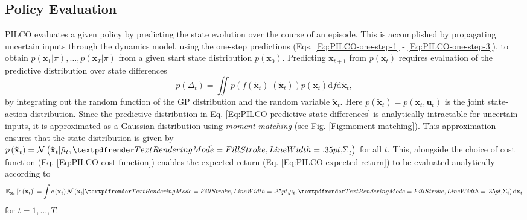 \subsection{Policy Evaluation}
\label{PILCO:policy-evaluation}
PILCO evaluates a given policy by predicting the state evolution over the course of an episode. This is accomplished by propagating uncertain inputs through the dynamics model, using the one-step predictions (Eqs. \ref{Eq:PILCO-one-step-1} - \ref{Eq:PILCO-one-step-3}), to obtain $p\left(\mathbf{x}_{1} | \pi\right), \ldots, p\left(\mathbf{x}_{T} | \pi\right)$ from a given start state distribution $p\left(\mathbf{x}_{0}\right)$. Predicting $\mathbf{x}_{t+1}$ from $p(\mathbf{x}_{t})$ requires evaluation of the predictive distribution over state differences
\begin{equation}
    p\left(\Delta_{t}\right)=\iint p\left(f\left(\tilde{\mathbf{x}}_{t}\right) | \left(\tilde{\mathbf{x}}_{t}\right)\right) p\left(\tilde{\mathbf{x}}_{t}\right) \mathrm{d} f \mathrm{d} \tilde{\mathbf{x}}_{t},
    \label{Eq:PILCO-predictive-state-differences}
\end{equation}
by integrating out the random function of the GP distribution and the random variable $\tilde{\mathbf{x}}_{t}$. Here $p\left(\tilde{\mathbf{x}}_{t}\right)=p\left(\mathbf{x}_{t}, \mathbf{u}_{t}\right)$ is the joint state-action distribution. Since the predictive distribution in Eq. \ref{Eq:PILCO-predictive-state-differences} is analytically intractable for uncertain inputs, it is approximated as a Gaussian distribution using \textit{moment matching} (see Fig. \ref{Fig:moment-matching}). This approximation ensures that the state distribution is given by $p\left(\tilde{\mathbf{x}}_{t}\right)=\mathcal{N}\left(\tilde{\mathbf{x}}_{t} | \tilde{\mathbf{\mu}}_{t}, \tilde{\boldgreek{\Sigma}}_{t}\right)$ for all $t$. This, alongside the choice of cost function (Eq. \ref{Eq:PILCO-cost-function}) enables the expected return (Eq. \ref{Eq:PILCO-expected-return}) to be evaluated analytically according to
\begin{equation}
    \mathbb{E}_{\mathbf{x}_{t}}\left[c\left(\mathbf{x}_{t}\right)\right]=\int c\left(\mathbf{x}_{t}\right) \mathcal{N}\left(\mathbf{x}_{t} | \boldgreek{\mu}_{t}, \boldgreek{\Sigma}_{t}\right) \mathrm{d} \mathbf{x}_{t}
\end{equation}
for $t=1,\dots,T$.

